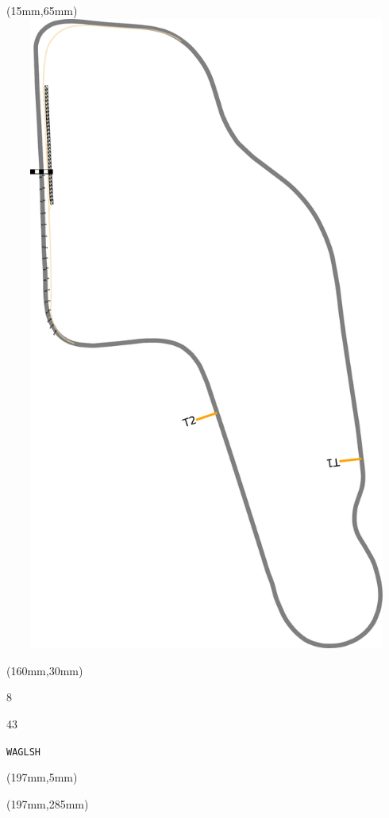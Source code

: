 \begin{textblock*}{185mm}(15mm,65mm)%
\centering
\mbox{\includegraphics[width=185mm,height=210mm,keepaspectratio]{PT/WAGLSH.pdf}}
\end{textblock*}
\begin{textblock*}{40mm}(160mm,30mm)%
\Large
\par{} 
\par8 
\par43 
\par\hfill\tiny\tt WAGLSH\\
\end{textblock*}
\begin{textblock*}{20mm}(197mm,5mm)%
\fbox{\thepage}
\label{WAGLSH}
\end{textblock*}
\begin{textblock*}{20mm}(197mm,285mm)%
\fbox{\thepage}
\end{textblock*}

